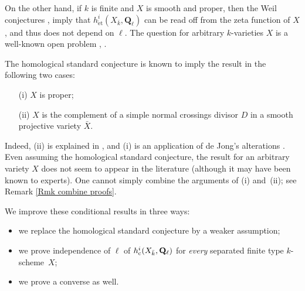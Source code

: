 \documentclass[11pt]{amsart}
\theoremstyle{definition}
\newcommand{\Q}{\mathbf Q}
\newcommand{\cs}{_{\text{\normalfont c}}}
\newcommand{\et}{_{\operatorname{\acute et}}}
\begin{document}
On the other hand, if $k$ is finite and $X$ is smooth and proper,
then the Weil conjectures \cite{WeilI}, \cite{WeilII} imply that
$h^i\et(X_{\bar k},\Q_\ell)$ can be read off from the zeta function
of $X$, and thus does not depend on $\ell$. The question for
arbitrary $k$-varieties $X$ is a well-known open problem
\cite[p.~28,~(2a)]{Katz}, \cite[3.5(c)]{Ill}.

The homological standard conjecture \cite[\S4, Remarks~(3)]{Gro} is known
to imply the result in the following two cases:
\begin{enumerate}
\item[\rm (i)] $X$ is proper;
\item[\rm (ii)] $X$ is the complement of a simple normal crossings divisor $D$ in a smooth projective variety $\bar X$.
\end{enumerate}
Indeed, (ii) is explained in \cite[p.~28--29]{Katz}, and (i) is an
application of de Jong's alterations \cite{dJ}. Even assuming the
homological standard conjecture, the result for an arbitrary variety
$X$ does not seem to appear in the literature (although it may have
been known to experts). One cannot simply combine the arguments of
(i) and~(ii); see Remark \ref{Rmk combine proofs}.

We improve these conditional results in three ways:
\begin{itemize}
\item we replace the homological standard conjecture by a weaker assumption;
\item we prove independence of $\ell$ of $h^i\cs(X_{\bar k},\Q_\ell)$ for \emph{every} separated finite type $k$-scheme~$X$;
\item we prove a converse as well.
\end{itemize}
\end{document}
